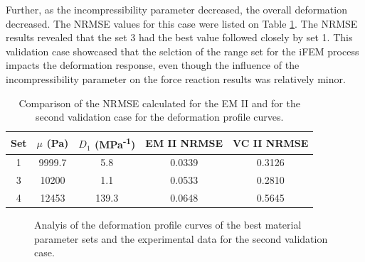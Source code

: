 Further, as the incompressibility parameter decreased, the overall deformation decreased. The 
NRMSE values for this case were listed on Table \ref{tab:nrmsedefprof}. The NRMSE results 
revealed that the set \SI{3}{} had the best value followed closely by set \SI{1}{}. This validation case 
showcased that the selction of the range set for the iFEM process impacts the deformation response, even though the
influence of the incompressibility parameter on the force reaction results was relatively minor.\\
\begin{table}[ht!]
    \centering
    \begin{tabular}{|c|c|c|c|c|}
    \hline
    Set & $\mu$ (Pa) & $D_1$ (MPa\textsuperscript{-1}) & EM II NRMSE & VC II NRMSE\\
    \hline
    1 & 9999.7 & 5.8 & 0.0339 & 0.3126\\
    3 & 10200 & 1.1 & 0.0533 & 0.2810\\
    4 & 12453 & 139.3 & 0.0648 & 0.5645\\
    \hline
    \end{tabular}
    \caption[NRMSE for second validation case]{Comparison of the NRMSE calculated for the EM II and for the second validation case for the deformation profile curves.}
	\label{tab:nrmsedefprof}
\end{table}

\begin{figure}%
    \centering
   \quad
   \caption[Second validation case measurement data]{Analyis of the deformation profile curves of the best material parameter sets and the experimental data for the second validation case.}%
   \label{fig:defprofiledata}%
\end{figure}

